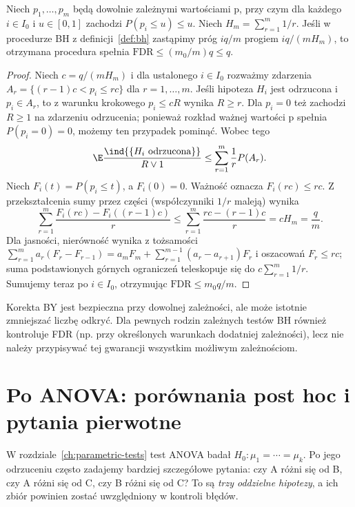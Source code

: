 \begin{twierdzenie}\label{thm:by}
Niech $p_1,\ldots,p_m$ będą dowolnie zależnymi
wartościami p, przy czym dla każdego $i\in I_0$
i $u\in[0,1]$ zachodzi $P(p_i\le u)\le u$.
Niech $H_m=\sum_{r=1}^m1/r$. Jeśli w procedurze BH
z definicji~\ref{def:bh} zastąpimy próg $iq/m$ progiem
$iq/(mH_m)$, to otrzymana procedura spełnia
$\mathrm{FDR}\le(m_0/m)q\le q$.
\end{twierdzenie}
\begin{proof}
Niech $c=q/(mH_m)$ i dla ustalonego $i\in I_0$
rozważmy zdarzenia $A_r=\{(r-1)c<p_i\le rc\}$
dla $r=1,\ldots,m$. Jeśli hipoteza $H_i$ jest
odrzucona i $p_i\in A_r$, to z warunku krokowego
$p_i\le cR$ wynika $R\ge r$. Dla $p_i=0$
też zachodzi $R\ge1$ na zdarzeniu odrzucenia;
ponieważ rozkład ważnej wartości p spełnia
$P(p_i=0)=0$, możemy ten przypadek pominąć.
Wobec tego
\[
 \E\frac{\ind{\{H_i\ \text{odrzucona}\}}}{R\vee1}
 \le\sum_{r=1}^m\frac1rP(A_r).
\]
Niech $F_i(t)=P(p_i\le t)$, a $F_i(0)=0$.
Ważność oznacza $F_i(rc)\le rc$. Z przekształcenia
sumy przez części (współczynniki $1/r$ maleją) wynika
\[
 \sum_{r=1}^m\frac{F_i(rc)-F_i((r-1)c)}r
 \le\sum_{r=1}^m\frac{rc-(r-1)c}{r}
 =cH_m=\frac qm.
\]
Dla jasności, nierówność wynika z tożsamości
$\sum_{r=1}^m a_r(F_r-F_{r-1})=
 a_mF_m+\sum_{r=1}^{m-1}(a_r-a_{r+1})F_r$
i oszacowań $F_r\le rc$; suma podstawionych górnych
ograniczeń teleskopuje się do $c\sum_{r=1}^m1/r$.
Sumujemy teraz po $i\in I_0$, otrzymując
$\mathrm{FDR}\le m_0q/m$.
\end{proof}

Korekta BY jest bezpieczna przy dowolnej zależności,
ale może istotnie zmniejszać liczbę odkryć. Dla pewnych
rodzin zależnych testów BH również kontroluje FDR
(np. przy określonych warunkach dodatniej zależności),
lecz nie należy przypisywać tej gwarancji wszystkim
możliwym zależnościom.

\section{Po ANOVA: porównania post hoc i pytania pierwotne}
W rozdziale~\ref{ch:parametric-tests} test ANOVA badał
$H_0:\mu_1=\cdots=\mu_k$. Po jego odrzuceniu często
zadajemy bardziej szczegółowe pytania: czy A różni się od B,
czy A różni się od C, czy B różni się od C? To są
\emph{trzy oddzielne hipotezy}, a ich zbiór powinien zostać
uwzględniony w kontroli błędów.

